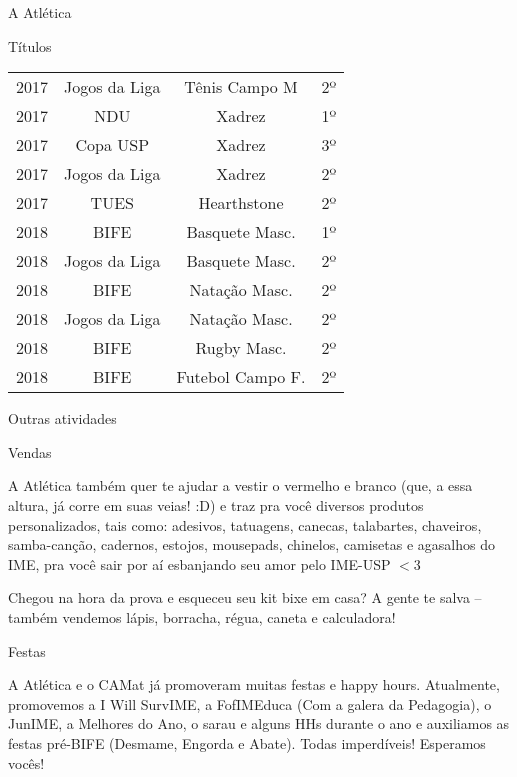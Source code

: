 \begin{secao}{A Atlética}
\begin{subsecao}{Títulos}
\begin{center}
\begin{tabular}{c|c|c|c}
    2017 & Jogos da Liga  & Tênis Campo M   & 2º\\
    2017 & NDU            & Xadrez          & 1º\\
    2017 & Copa USP       & Xadrez          & 3º\\
    2017 & Jogos da Liga  & Xadrez          & 2º\\
    2017 & TUES           & Hearthstone     & 2º\\
    2018 & BIFE           & Basquete Masc.  & 1º\\
    2018 & Jogos da Liga  & Basquete Masc.  & 2º\\
    2018 & BIFE           & Natação Masc.   & 2º\\
    2018 & Jogos da Liga  & Natação Masc.   & 2º\\
    2018 & BIFE           & Rugby Masc.     & 2º\\
    2018 & BIFE           & Futebol Campo F.& 2º
  \end{tabular}
\end{center}

\end{subsecao}
\begin{subsecao}{Outras atividades}

\begin{subsubsecao}{Vendas}

A Atlética também quer te ajudar a vestir o vermelho e branco (que, a essa
altura, já corre em suas veias! :D) e traz pra você diversos produtos
personalizados, tais como: adesivos, tatuagens, canecas, talabartes, chaveiros,
samba-canção, cadernos, estojos, mousepads, chinelos, camisetas e agasalhos do
IME, pra você sair por aí esbanjando seu amor pelo IME-USP $<$3

Chegou na hora da prova e esqueceu seu kit bixe em casa? A gente te salva --
também vendemos lápis, borracha, régua, caneta e calculadora!

\end{subsubsecao}
\begin{subsubsecao}{Festas}

A Atlética e o CAMat já promoveram muitas festas e happy hours. Atualmente,
promovemos a I Will SurvIME, a FofIMEduca (Com a galera da Pedagogia), o 
JunIME, a Melhores do Ano, o sarau e alguns HHs durante o ano e auxiliamos 
as festas pré-BIFE (Desmame, Engorda e Abate). Todas imperdíveis!
Esperamos vocês!


\end{subsubsecao}
\end{subsecao}
\end{secao}
